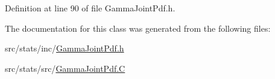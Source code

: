 Definition at line 90 of file Gamma\-Joint\-Pdf.\-h.



The documentation for this class was generated from the following files\-:\begin{DoxyCompactItemize}
\item 
src/stats/inc/\hyperlink{_gamma_joint_pdf_8h}{Gamma\-Joint\-Pdf.\-h}\item 
src/stats/src/\hyperlink{_gamma_joint_pdf_8_c}{Gamma\-Joint\-Pdf.\-C}\end{DoxyCompactItemize}
